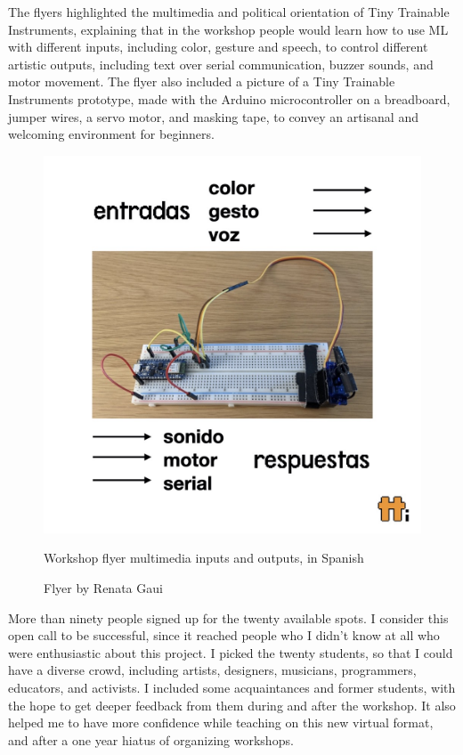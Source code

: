 The flyers highlighted the multimedia and political orientation of Tiny Trainable Instruments, explaining that in the workshop people would learn how to use \acrshort{ML} with different inputs, including color, gesture and speech, to control different artistic outputs, including text over serial communication, buzzer sounds, and motor movement. The flyer also included a picture of a Tiny Trainable Instruments prototype, made with the Arduino microcontroller on a breadboard, jumper wires, a servo motor, and masking tape, to convey an artisanal and welcoming environment for beginners.


\begin{figure}[ht]
  \centering
  \includegraphics[width=0.75\linewidth,height=0.35\textheight,keepaspectratio]{images/workshop-es-2.jpg}
  \caption{Workshop flyer multimedia inputs and outputs, in Spanish}
  \caption*{Flyer by Renata Gaui}
  \label{fig:workshop-spanish-flyer-page-2}
\end{figure}

More than ninety people signed up for the twenty available spots. I consider this open call to be successful, since it reached people who I didn't know at all who were enthusiastic about this project. I picked the twenty students, so that I could have a diverse crowd, including artists, designers, musicians, programmers, educators, and activists. I included some acquaintances and former students, with the hope to get deeper feedback from them during and after the workshop. It also helped me to have more confidence while teaching on this new virtual format, and after a one year hiatus of organizing workshops.

